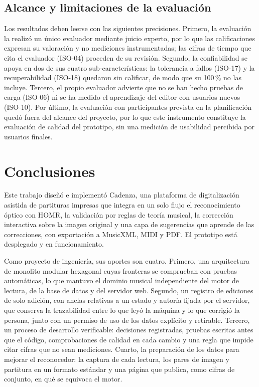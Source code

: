 \documentclass[conference]{IEEEtran}
\begin{document}
\subsection{Alcance y limitaciones de la evaluación}

Los resultados deben leerse con las siguientes precisiones. Primero, la
evaluación la realizó un único evaluador mediante juicio experto, por lo
que las calificaciones expresan su valoración y no mediciones
instrumentadas; las cifras de tiempo que cita el evaluador (ISO-04) proceden
de su revisión. Segundo, la confiabilidad se apoya en dos de sus cuatro
sub-características: la tolerancia a fallos (ISO-17) y la recuperabilidad
(ISO-18) quedaron sin calificar, de modo que su 100\,\% no las incluye.
Tercero, el propio evaluador advierte que no se han hecho pruebas de carga
(ISO-06) ni se ha medido el aprendizaje del editor con usuarios nuevos
(ISO-10). Por último, la evaluación con participantes prevista en la
planificación quedó fuera del alcance del proyecto, por lo que este
instrumento constituye la evaluación de calidad del
prototipo, sin una medición de usabilidad percibida por usuarios finales.


\section{Conclusiones}
\label{sec:conclusiones}

Este trabajo diseñó e implementó Cadenza, una plataforma de digitalización
asistida de partituras impresas que integra en un solo flujo el
reconocimiento óptico con HOMR, la validación por reglas de teoría
musical, la corrección interactiva sobre la imagen original y una capa de
sugerencias que aprende de las correcciones, con exportación a MusicXML,
MIDI y PDF. El prototipo está desplegado y en funcionamiento.

Como proyecto de ingeniería, sus aportes son cuatro. Primero, una
arquitectura de monolito modular hexagonal cuyas fronteras se comprueban
con pruebas automáticas, lo que mantuvo el dominio musical independiente
del motor de lectura, de la base de datos y del servidor web. Segundo, un
registro de ediciones de solo adición, con anclas relativas a un estado y
autoría fijada por el servidor, que conserva la trazabilidad entre lo que
leyó la máquina y lo que corrigió la persona, junto con un permiso de uso
de los datos explícito y retirable. Tercero, un proceso de desarrollo
verificable: decisiones registradas, pruebas escritas antes que el código,
comprobaciones de calidad en cada cambio y una regla que impide citar
cifras que no sean mediciones. Cuarto, la preparación de los datos para
mejorar el reconocedor: la captura de cada lectura, los pares de imagen y
partitura en un formato estándar y una página que publica, como cifras de
conjunto, en qué se equivoca el motor.
\end{document}

